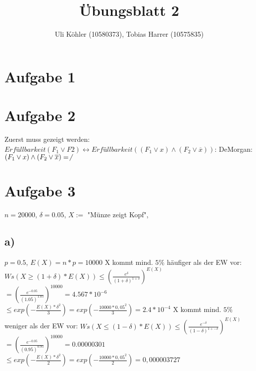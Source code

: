 \documentclass[a4paper,10pt,oneside,leqno]{scrartcl}
\title{Übungsblatt 2}
\author{Uli Köhler (10580373), Tobias Harrer (10575835)}
\begin{document}
\maketitle
\section*{Aufgabe 1}%

\section*{Aufgabe 2}%
Zuerst muss gezeigt werden: $Erfüllbarkeit(F_1\vee F2) \leftrightarrow Erfüllbarkeit((F_1\vee x) \wedge (F_2 \vee \overline{x}))$:
DeMorgan: $(F_1\vee x) \wedge (F_2 \vee \overline{x}) = \not $
\section*{Aufgabe 3}%
$n=20000$, $\delta = 0.05$, $X :=$ "Münze zeigt Kopf",
\subsection*{a)}
$p = 0.5$, $E(X) = n*p = 10000$\newline
X kommt mind. $5\%$ häufiger als der EW vor:\newline
$Ws(X \geq (1+\delta) * E(X)) \leq (\frac{e^{\delta}}{(1+\delta)^{1+\delta}})^{E(X)}$\newline
$=(\frac{e^{-0.05}}{(1.05)^{1.05}})^{10000} = 4.567*10^{-6}$\newline
$\leq exp(-\frac{E(X)*\delta^2}{3}) = exp(-\frac{10000*0,05^2}{3}) = 2.4*10^{-4}$\newline \newline
X kommt mind. $5\%$ weniger als der EW vor:\newline
$Ws(X \leq (1-\delta) * E(X)) \leq (\frac{e^{-\delta}}{(1-\delta)^{1+-\delta}})^{E(X)}$\newline
$=(\frac{e^{-0.05}}{(0.95)^{0.95}})^{10000} = 0.00000301$\newline
$\leq exp(-\frac{E(X)*\delta^2}{2}) = exp(-\frac{10000*0,05^2}{2}) = 0,000003727$\newline
\end{document}
